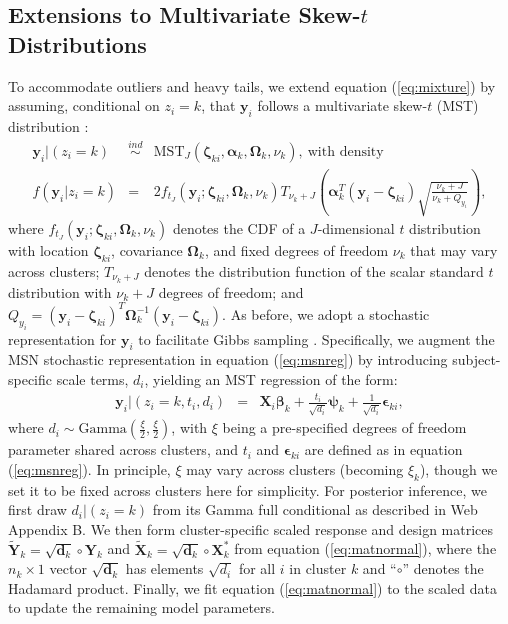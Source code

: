 \documentclass[useAMS,usenatbib,referee]{biom}
\begin{document}
\subsection{Extensions to Multivariate Skew-$t$ Distributions}
To accommodate outliers and heavy tails, we extend equation (\ref{eq:mixture}) by assuming, conditional on $z_i = k$, that $\mathbf{y}_i$ follows a multivariate skew-$t$ (MST) distribution \citep{gupta2003multivariate}:
\begin{eqnarray}
\mathbf{y}_{i}|(z_i=k) &\stackrel{ind}{\sim}& \text{MST}_J(\boldsymbol\zeta_{ki},\boldsymbol\alpha_k,\boldsymbol\Omega_k,\nu_k), ~\text{with density} \label{eq:mstdens}\nonumber\\
f(\mathbf{y}_i|z_i=k) &=& 2f_{t_J}(\mathbf{y}_i;\boldsymbol\zeta_{ki},\boldsymbol\Omega_k,\nu_k)T_{\nu_k + J} \left ( \boldsymbol\alpha^T_k(\mathbf{y}_i-\boldsymbol\zeta_{ki})\sqrt{\frac{\nu_k+J}{\nu_k+Q_{y_i}}} \right ),
\end{eqnarray}
where $f_{t_J}(\mathbf{y}_i;\boldsymbol\zeta_{ki},\boldsymbol\Omega_k,\nu_k)$ denotes the CDF of a $J$-dimensional $t$ distribution with location $\boldsymbol\zeta_{ki}$, covariance $\boldsymbol\Omega_k$, and fixed degrees of freedom $\nu_k$ that may vary across clusters; $T_{\nu_k + J}$ denotes the distribution function of the scalar standard $t$ distribution with $\nu_k + J$ degrees of freedom; and $Q_{y_i} = (\mathbf{y}_i-\boldsymbol\zeta_{ki})^T\boldsymbol\Omega_k^{-1}(\mathbf{y}_i-\boldsymbol\zeta_{ki})$. As before, we adopt a stochastic representation for $\mathbf{y}_i$ to facilitate Gibbs sampling \citep{fruhwirth2010bayesian}. Specifically, we augment the MSN stochastic representation in equation (\ref{eq:msnreg}) by introducing subject-specific scale terms, $d_i$, yielding an MST regression of the form:
\begin{eqnarray}
\mathbf{y}_{i}|(z_i=k,t_i,d_i) &=& \mathbf{X}_i \boldsymbol\beta_k +  \frac{t_i}{\sqrt{d_i}}\boldsymbol\psi_k + \frac{1}{\sqrt{d_i}}\boldsymbol\epsilon_{ki}, \label{eq:mstreg}
\end{eqnarray}
where $d_i \sim \text{Gamma} \left (\frac{\xi}{2},\frac{\xi}{2} \right )$, with $\xi$ being a pre-specified degrees of freedom parameter shared across clusters, and $t_i$ and $\boldsymbol\epsilon_{ki}$ are defined as in equation (\ref{eq:msnreg}). In principle, $\xi$ may vary across clusters (becoming $\xi_k$), though we set it to be fixed across clusters here for simplicity. For posterior inference, we first draw $d_i|(z_i=k)$ from its Gamma full conditional as described in Web Appendix B. We then form cluster-specific scaled response and design matrices $\tilde{\mathbf{Y}}_{k}=\sqrt{\mathbf{d}_k}\circ\mathbf{Y}_{k}$ and $\tilde{\mathbf{X}}_k=\sqrt{\mathbf{d}_k}\circ\mathbf{X}^*_k$ from equation (\ref{eq:matnormal}), where the $n_k\times 1$ vector $\sqrt{\mathbf{d}_k}$ has elements $\sqrt{d_i}$ for all $i$ in cluster $k$ and ``$\circ$'' denotes the Hadamard product. Finally, we fit equation (\ref{eq:matnormal}) to the scaled data to update the remaining model parameters.
\end{document}
